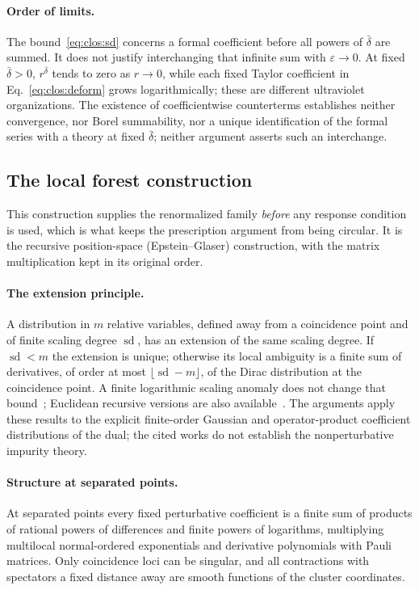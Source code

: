 \documentclass[11pt,a4paper]{article}
\numberwithin{equation}{section}
\newcommand{\db}{\bar\delta}
\begin{document}
\paragraph{Order of limits.} The bound~\eqref{eq:clos:sd} concerns a formal coefficient before all powers of $\db$ are
summed. It does not justify interchanging that infinite sum with $\varepsilon\to0$. At fixed $\db>0$, $r^{\db}$ tends to
zero as $r\to0$, while each fixed Taylor coefficient in Eq.~\eqref{eq:clos:deform} grows logarithmically; these are
different ultraviolet organizations. The existence of coefficientwise counterterms establishes neither convergence,
nor Borel summability, nor a unique identification of the formal series with a theory at fixed $\db$; neither argument
asserts such an interchange.

\subsection{The local forest construction}\label{app:clos:forest}
This construction supplies the renormalized family \emph{before} any response condition is used, which is what keeps
the prescription argument from being circular. It is the recursive position-space (Epstein--Glaser) construction,
with the matrix multiplication kept in its original order.

\paragraph{The extension principle.} A distribution in $m$ relative variables, defined away from a coincidence point and
of finite scaling degree $\operatorname{sd}$, has an extension of the same scaling degree. If $\operatorname{sd}<m$ the
extension is unique; otherwise its local ambiguity is a finite sum of derivatives, of order at most
$\lfloor\operatorname{sd}-m\rfloor$, of the Dirac distribution at the coincidence point. A finite logarithmic scaling
anomaly does not change that bound~\cite{Brunetti:2000,Dutsch:2014}; Euclidean recursive versions are also
available~\cite{Keller:2009}. The arguments apply these results to the explicit finite-order Gaussian and
operator-product coefficient distributions of the dual; the cited works do not establish the nonperturbative impurity
theory.

\paragraph{Structure at separated points.} At separated points every fixed perturbative coefficient is a finite sum of
products of rational powers of differences and finite powers of logarithms, multiplying multilocal normal-ordered
exponentials and derivative polynomials with Pauli matrices. Only coincidence loci can be singular, and all
contractions with spectators a fixed distance away are smooth functions of the cluster coordinates.
\end{document}
